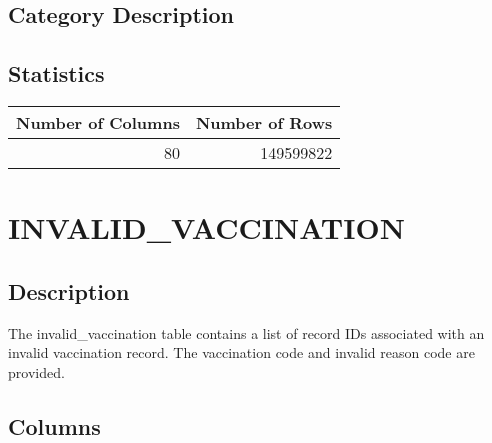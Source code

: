 \documentclass[
  letterpaper,
  DIV=11,
  numbers=noendperiod]{scrreprt}
\begin{document}
\hypertarget{category-description-13}{%
\section*{Category Description}\label{category-description-13}}

\hypertarget{statistics-13}{%
\section*{Statistics}\label{statistics-13}}

\begin{longtable}{rr}
\toprule
Number of Columns & Number of Rows \\ 
\midrule
80 & 149599822 \\ 
\bottomrule
\end{longtable}

\hypertarget{invalid_vaccination}{%
\chapter*{INVALID\_VACCINATION}\label{invalid_vaccination}}

\hypertarget{description-14}{%
\section*{Description}\label{description-14}}

The invalid\_vaccination table contains a list of record IDs associated
with an invalid vaccination record. The vaccination code and invalid
reason code are provided.

\hypertarget{columns-14}{%
\section*{Columns}\label{columns-14}}
\end{document}
